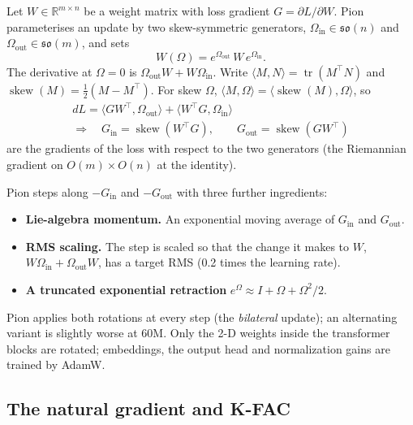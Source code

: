 \documentclass{article}
\providecommand{\tightlist}{\setlength{\itemsep}{0pt}\setlength{\parskip}{0pt}}
\begin{document}
Let \(W \in \mathbb{R}^{m \times n}\) be a weight matrix with loss gradient \(G = \partial L / \partial W\).
Pion parameterises an update by two skew-symmetric generators,
\(\Omega_{\mathrm{in}} \in \mathfrak{so}(n)\) and \(\Omega_{\mathrm{out}} \in \mathfrak{so}(m)\), and sets
\[W(\Omega) = e^{\Omega_{\mathrm{out}}}\, W\, e^{\Omega_{\mathrm{in}}}.\]
The derivative at \(\Omega = 0\) is \(\Omega_{\mathrm{out}} W + W \Omega_{\mathrm{in}}\). Write
\(\langle M, N \rangle = \operatorname{tr}(M^\top N)\) and \(\operatorname{skew}(M) = \tfrac12(M - M^\top)\).
For skew \(\Omega\), \(\langle M, \Omega\rangle = \langle \operatorname{skew}(M), \Omega\rangle\), so
\begin{gather*}
dL = \langle G W^\top, \Omega_{\mathrm{out}}\rangle + \langle W^\top G, \Omega_{\mathrm{in}}\rangle
\\ \Longrightarrow\quad
G_{\mathrm{in}} = \operatorname{skew}(W^\top G), \qquad G_{\mathrm{out}} = \operatorname{skew}(G W^\top)
\end{gather*}
are the gradients of the loss with respect to the two generators (the Riemannian gradient on
\(O(m) \times O(n)\) at the identity).

Pion steps along \(-G_{\mathrm{in}}\) and \(-G_{\mathrm{out}}\) with three further ingredients:

\begin{itemize}
\tightlist
\item
  \textbf{Lie-algebra momentum.} An exponential moving average of \(G_{\mathrm{in}}\) and \(G_{\mathrm{out}}\).
\item
  \textbf{RMS scaling.} The step is scaled so that the change it makes to \(W\),
  \(W\Omega_{\mathrm{in}} + \Omega_{\mathrm{out}} W\), has a target RMS (0.2 times the learning rate).
\item
  \textbf{A truncated exponential retraction} \(e^{\Omega} \approx I + \Omega + \Omega^2/2\).
\end{itemize}

Pion applies both rotations at every step (the \emph{bilateral} update); an alternating variant is slightly
worse at 60M. Only the 2-D weights inside the transformer blocks are rotated; embeddings, the output head and
normalization gains are trained by AdamW.

\subsection{The natural gradient and K-FAC}\label{sec:2.2}
\end{document}
